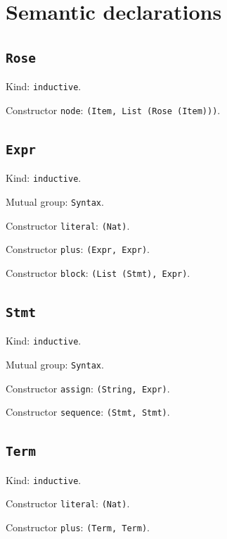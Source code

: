 \documentclass[11pt]{article}
\begin{document}
\section*{Semantic declarations}
\subsection*{\texttt{Rose}}
\noindent Kind: \texttt{inductive}.\par
\noindent Constructor \texttt{node}: \texttt{(Item, List (Rose (Item)))}.\par
\subsection*{\texttt{Expr}}
\noindent Kind: \texttt{inductive}.\par
\noindent Mutual group: \texttt{Syntax}.\par
\noindent Constructor \texttt{literal}: \texttt{(Nat)}.\par
\noindent Constructor \texttt{plus}: \texttt{(Expr, Expr)}.\par
\noindent Constructor \texttt{block}: \texttt{(List (Stmt), Expr)}.\par
\subsection*{\texttt{Stmt}}
\noindent Kind: \texttt{inductive}.\par
\noindent Mutual group: \texttt{Syntax}.\par
\noindent Constructor \texttt{assign}: \texttt{(String, Expr)}.\par
\noindent Constructor \texttt{sequence}: \texttt{(Stmt, Stmt)}.\par
\subsection*{\texttt{Term}}
\noindent Kind: \texttt{inductive}.\par
\noindent Constructor \texttt{literal}: \texttt{(Nat)}.\par
\noindent Constructor \texttt{plus}: \texttt{(Term, Term)}.\par
\end{document}
